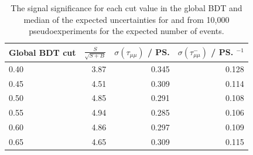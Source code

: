 \begin{table}[htbp]
\begin{center}
\begin{tabular}{lrrr}
\toprule \toprule
Global BDT cut & $\frac{S}{\sqrt{S+B}}$&  $\sigma \left(\tau_{\mu\mu} \right)$   / \ps & $\sigma \left(\tau^{-}_{\mu\mu} \right)$ / \ps$^{-1}$ \\   
\midrule
0.40           & 3.87 & 0.345 & 0.128 \\ %
0.45        & 4.51 & 0.309 & 0.114 \\ %
0.50        & 4.85 & 0.291 & 0.108 \\ %
0.55       & 4.94 & 0.285 & 0.106 \\ %
0.60           & 4.86 & 0.297 & 0.109 \\ %
0.65            & 4.65 & 0.309 & 0.115 \\  \bottomrule \bottomrule%
\end{tabular} 
\vspace{0.7cm}
\caption{ The signal significance for each cut value in the global BDT and median of the expected uncertainties for \tmumu and \invtmumu from 10,000 pseudoexperiments for the expected number of events. }
\label{tab:selOptimisation}
\end{center}
\vspace{-1.0cm}
\end{table}

